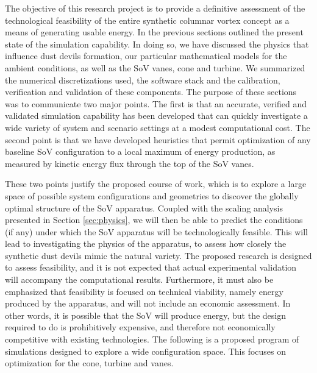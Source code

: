 \label{sec:conclusions}

The objective of this research project is to provide a definitive
assessment of the technological feasibility of the entire synthetic
columnar vortex concept as a means of generating usable energy. In the 
previous sections outlined the present state of the
simulation capability. In doing so, we have discussed the physics that
influence dust devils formation, our particular mathematical
models for the ambient conditions, as well as the SoV vanes, cone and
turbine. We summarized the numerical discretizations used, the software
stack and the calibration, verification and validation of these
components. The purpose of these sections was to communicate
two major points. The first is that an accurate, verified and
validated simulation capability has been developed that can quickly
investigate a wide variety of system and scenario settings at a modest
computational cost. The second point is that we have developed
heuristics that permit optimization of any baseline SoV configuration to
a local maximum of energy production, as measured by kinetic energy flux
through the top of the SoV vanes.  

These two points justify the proposed course of work, which is to
explore a large space of possible system configurations
and geometries to discover the globally optimal structure
of the SoV apparatus. Coupled with the scaling analysis presented in
Section \ref{sec:physics}, we will then be able to predict the
conditions (if any) under which the SoV apparatus will be
technologically feasible. This will lead to investigating the physics of the
apparatus, to assess how closely the synthetic dust devils mimic the
natural variety. The proposed research is designed to
assess feasibility, and it is not expected that actual experimental
validation will accompany the computational results. Furthermore, it
must also be emphasized that feasibility is focused on
technical viability, namely energy produced by the apparatus,
and will not include an economic assessment. In other words, it is
possible that the SoV will produce energy, but the design required to do
is prohibitively expensive, and therefore not economically competitive
with existing technologies. The following is a proposed program of simulations 
designed to explore a wide configuration space. This focuses on
optimization for the cone, turbine and vanes. 

